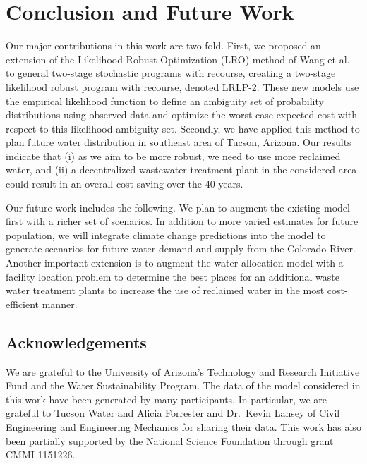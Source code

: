 \documentclass[12pt]{amsart}
\begin{document}
\section{Conclusion and Future Work}
\label{sec:concl}

Our major contributions in this work are two-fold. 
First, we proposed an extension of the Likelihood Robust Optimization (LRO) method of Wang et al.\ \cite{wang2010likelihood} to general two-stage stochastic programs with recourse, creating a two-stage likelihood robust program with recourse, denoted LRLP-2.
These new models use the empirical likelihood function to define an ambiguity set of probability distributions using observed data and optimize the worst-case expected cost with respect to this likelihood ambiguity set. 
Secondly, we have applied this method to plan future water distribution in southeast area of Tucson, Arizona. 
Our results indicate that (i) as we aim to be more robust, we need to use more reclaimed water, and (ii) a decentralized wastewater treatment plant in the considered area could result in an overall cost saving over the 40 years.

Our future work includes the following. We plan to augment the existing model first with a richer set of scenarios.
In addition to more varied estimates for future population, we will integrate climate change predictions into the model to generate scenarios for future water demand and supply from the Colorado River. 
Another important extension is to augment the water allocation model with a facility location problem to determine the best places for an additional waste water treatment plants to increase the use of reclaimed water in the most cost-efficient manner.

\subsection*{Acknowledgements}
\noindent We are grateful to the University of Arizona's Technology and Research Initiative Fund and the Water Sustainability Program.  The data of the model considered in this work have been generated by many participants. In particular, we are grateful to Tucson Water and Alicia Forrester and Dr.\ Kevin Lansey of Civil Engineering and Engineering Mechanics for sharing their data. This work has also been partially supported by the National Science Foundation through grant CMMI-1151226.



\end{document}
